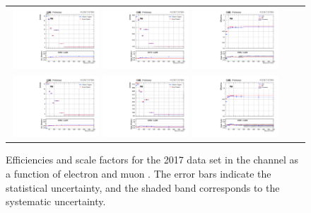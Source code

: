 {\begin{figure}[h]
  \begin{center}
    \begin{tabular}{ccc}
      \includegraphics[width=0.32\textwidth]{fig_2017_TrigSF/g_lepApt_emu_MC.pdf}
      \includegraphics[width=0.32\textwidth]{fig_2017_TrigSF/g_lepApt_emu_data.pdf}
      \includegraphics[width=0.32\textwidth]{fig_2017_TrigSF/g_emu_lepApt_FullSystUncBand.pdf}\\
      \includegraphics[width=0.32\textwidth]{fig_2017_TrigSF/g_lepBpt_emu_MC.pdf}
      \includegraphics[width=0.32\textwidth]{fig_2017_TrigSF/g_lepBpt_emu_data.pdf}
      \includegraphics[width=0.32\textwidth]{fig_2017_TrigSF/g_emu_lepBpt_FullSystUncBand.pdf}\\
    \end{tabular}
    \caption{Efficiencies and scale factors for the 2017 data set in the \emu channel as a function of electron and muon \pT.
            The error bars indicate the statistical uncertainty, and the shaded band corresponds to the systematic uncertainty.
            }
    \label{TrigSF_2017_1}
  \end{center}
\end{figure}

}
